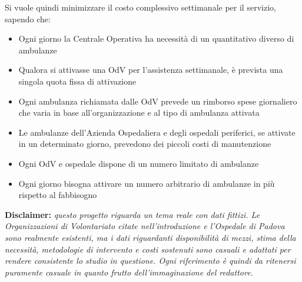 \newline \newline
Si vuole quindi minimizzare il costo complessivo settimanale per il servizio, sapendo che:
\begin{itemize}
    \item Ogni giorno la Centrale Operativa ha necessità di un quantitativo diverso di ambulanze
    \item Qualora si attivasse una OdV per l'assistenza settimanale, è prevista una singola quota fissa di attivazione
    \item Ogni ambulanza richiamata dalle OdV prevede un rimborso spese giornaliero che varia in base all'organizzazione e al tipo di ambulanza attivata
    \item Le ambulanze dell'Azienda Ospedaliera e degli ospedali periferici, se attivate in un determinato giorno, prevedono dei piccoli costi di manutenzione
    \item Ogni OdV e ospedale dispone di un numero limitato di ambulanze
    \item Ogni giorno bisogna attivare un numero arbitrario di ambulanze in più rispetto al fabbisogno
\end{itemize}
\vspace*{3 cm}
\textbf{Disclaimer: } \textit{questo progetto riguarda un tema reale con dati fittizi. Le Organizzazioni di Volontariato citate nell'introduzione e l'Ospedale di Padova sono realmente esistenti, ma i dati riguardanti disponibilità di mezzi, stima della necessità, metodologie di intervento e costi sostenuti sono casuali e adattati per rendere consistente lo studio in questione. Ogni riferimento è quindi da ritenersi puramente casuale in quanto frutto dell'immaginazione del redattore.}